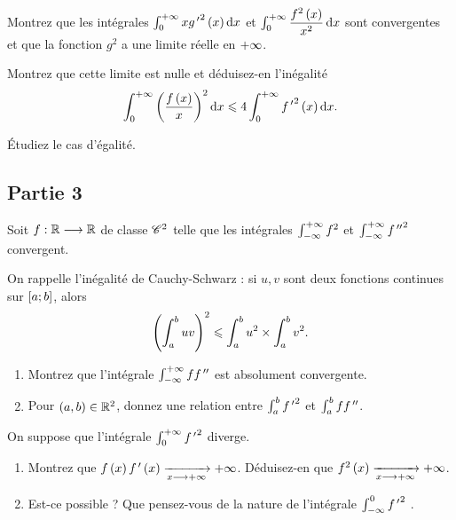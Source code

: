 \begin{q}
Montrez que les intégrales \(\int_0^{\pinf}x{g\prim}^2\paren{x}\odif{x}\) et \(\int_0^{\pinf}\dfrac{f^2\paren{x}}{x^2}\odif{x}\) sont convergentes et que la fonction \(g^2\) a une limite réelle en \(+\infty\).
\end{q}

\begin{q}
Montrez que cette limite est nulle et déduisez-en l'inégalité \[\int_0^{\pinf}\paren{\dfrac{f\paren{x}}{x}}^2\odif{x}\leq4\int_0^{\pinf}{f\prim}^2\paren{x}\odif{x}.\]
\end{q}

\begin{q}
Étudiez le cas d'égalité.
\end{q}

\subsection*{Partie 3}

Soit \(f:\mathbb{R}\longrightarrow\mathbb{R}\) de classe \(\mathscr{C}^{2}\) telle que les intégrales \(\int_{-\infty}^{+\infty}f^2\) et \(\int_{-\infty}^{+\infty}{f^{\,\prime\prime}}^2\) convergent.

On rappelle l'inégalité de Cauchy-Schwarz : si \(u,v\) sont deux fonctions continues sur \(\left[a;b\right]\), alors \[\left(\int_a^buv\right)^2\leqslant\int_a^bu^2\times\int_a^bv^2.\]

\begin{q}
\begin{enumerate}
    \item Montrez que l'intégrale \(\int_{-\infty}^{+\infty}ff^{\,\prime\prime}\) est absolument convergente. \\
    \item Pour \(\left(a,b\right)\in\mathbb{R}^2\), donnez une relation entre \(\int_a^b{f^{\,\prime}}^2\) et \(\int_a^bff^{\,\prime\prime}\).
\end{enumerate}
\end{q}

\begin{q}
On suppose que l'intégrale \(\int_0^{+\infty}{f^{\,\prime}}^2\) diverge.

\begin{enumerate}
    \item Montrez que \(f\left(x\right)f^{\,\prime}\left(x\right)\xrightarrow[x\longrightarrow+\infty]{}+\infty\). Déduisez-en que \(f^2\left(x\right)\xrightarrow[x\longrightarrow+\infty]{}+\infty\). \\
    \item Est-ce possible ? Que pensez-vous de la nature de l'intégrale \(\int_{-\infty}^0{f^{\,\prime}}^2\) .
\end{enumerate}
\end{q}

